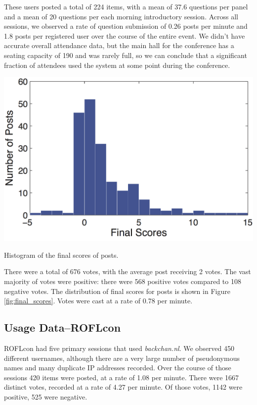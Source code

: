 These users posted a total of 224 items, with a mean of 37.6 questions per panel and a mean of 20 questions per each morning introductory session. Across all sessions, we observed a rate of question submission of 0.26 posts per minute and 1.8 posts per registered user over the course of the entire event. We didn't have accurate overall attendance data, but the main hall for the conference has a seating capacity of 190 and was rarely full, so we can conclude that a significant fraction of attendees used the system at some point during the conference.

\begin{marginfigure}
	\includegraphics{figures/backchannl/final_scores.png}
	\caption{Histogram of the final scores of posts.}
	\label{fig:final_scores}
\end{marginfigure}

There were a total of 676 votes, with the average post receiving 2 votes. The vast majority of votes were positive: there were 568 positive votes compared to 108 negative votes. The distribution of final scores for posts is shown in Figure \ref{fig:final_scores}. Votes were cast at a rate of 0.78 per minute.



\subsection{Usage Data--ROFLcon}
ROFLcon had five primary sessions that used \emph{backchan.nl}. We observed 450 different usernames, although there are a very large number of pseudonymous names and many duplicate IP addresses recorded. Over the course of those sessions 420 items were posted, at a rate of 1.08 per minute.
There were 1667 distinct votes, recorded at a rate of 4.27 per minute. Of those votes, 1142 were positive, 525 were negative. 



